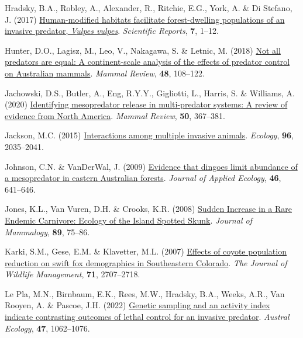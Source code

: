 \documentclass[preprint, 3p, authoryear]{elsarticle} %
\newlength{\cslhangindent}
\newlength{\cslentryspacingunit} %
\newenvironment{CSLReferences}[2] %
 {%
  \setlength{\parindent}{0pt}
  \ifodd #1
  \let\oldpar\par
  \def\par{\hangindent=\cslhangindent\oldpar}
  \fi
  \setlength{\parskip}{#2\cslentryspacingunit}
 }%
 {}
\begin{document}
\begin{CSLReferences}{1}{0}
\leavevmode{}%
Hradsky, B.A., Robley, A., Alexander, R., Ritchie, E.G., York, A. \& Di Stefano, J. (2017) \href{https://doi.org/10.1038/s41598-017-12464-7}{Human-modified habitats facilitate forest-dwelling populations of an invasive predator, \emph{{V}ulpes vulpes}}. \emph{Scientific Reports}, \textbf{7}, 1--12.

\leavevmode{}%
Hunter, D.O., Lagisz, M., Leo, V., Nakagawa, S. \& Letnic, M. (2018) \href{https://doi.org/10.1111/mam.12115}{Not all predators are equal: A continent-scale analysis of the effects of predator control on {{A}ustralian} mammals}. \emph{Mammal Review}, \textbf{48}, 108--122.

\leavevmode{}%
Jachowski, D.S., Butler, A., Eng, R.Y.Y., Gigliotti, L., Harris, S. \& Williams, A. (2020) \href{https://doi.org/10.1111/mam.12207}{Identifying mesopredator release in multi-predator systems: A review of evidence from {North America}}. \emph{Mammal Review}, \textbf{50}, 367--381.

\leavevmode{}%
Jackson, M.C. (2015) \href{https://doi.org/10.1890/15-0171.1}{Interactions among multiple invasive animals}. \emph{Ecology}, \textbf{96}, 2035--2041.

\leavevmode{}%
Johnson, C.N. \& VanDerWal, J. (2009) \href{https://doi.org/10.1111/j.1365-2664.2009.01650.x}{Evidence that dingoes limit abundance of a mesopredator in eastern {{A}ustralian} forests}. \emph{Journal of Applied Ecology}, \textbf{46}, 641--646.

\leavevmode{}%
Jones, K.L., Van Vuren, D.H. \& Crooks, K.R. (2008) \href{https://doi.org/10.1644/07-MAMM-A-034.1}{{Sudden Increase in a Rare Endemic Carnivore: Ecology of the Island Spotted Skunk}}. \emph{Journal of Mammalogy}, \textbf{89}, 75--86.

\leavevmode{}%
Karki, S.M., Gese, E.M. \& Klavetter, M.L. (2007) \href{https://doi.org/10.2193/2006-275}{Effects of coyote population reduction on swift fox demographics in {Southeastern Colorado}}. \emph{The Journal of Wildlife Management}, \textbf{71}, 2707--2718.

\leavevmode{}%
Le Pla, M.N., Birnbaum, E.K., Rees, M.W., Hradsky, B.A., Weeks, A.R., Van Rooyen, A. \& Pascoe, J.H. (2022) \href{https://doi.org/10.1111/aec.13182}{Genetic sampling and an activity index indicate contrasting outcomes of lethal control for an invasive predator}. \emph{Austral Ecology}, \textbf{47}, 1062--1076.


\end{CSLReferences}
\end{document}
